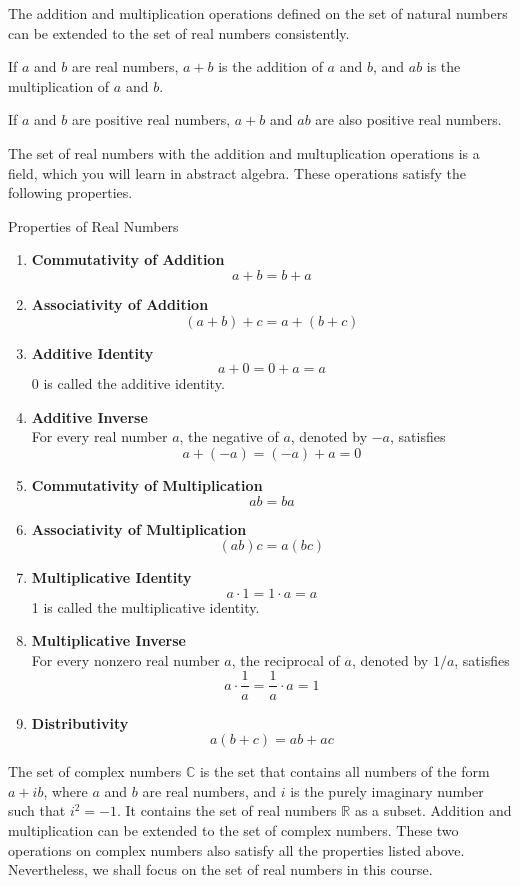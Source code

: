 The   addition and multiplication operations defined on the set of natural numbers can be extended to the set of real numbers consistently. 

If $a$ and $b$ are  real numbers, $a+b$ is the addition of  $a$ and $b$, and $ab$ is the multiplication of $a$ and $b$.

If $a$ and $b$ are positive real numbers, $a+b$ and $ab$ are also positive real numbers.



The set of real numbers with the addition and multuplication operations is a field, which you will learn in abstract algebra. These operations satisfy the following properties.


 
 \begin{highlight}{Properties of Real Numbers}

 
         \begin{enumerate} [1.]
\item
\textbf{Commutativity of Addition}
\[a+b=b+a\]
\item \textbf{Associativity of Addition}
\[(a+b)+c=a+(b+c)\]
\item\textbf{Additive Identity }
\[a+0=0+a=a\]
0 is called the additive identity.
\item\textbf{Additive Inverse}
\\For every real number $a$, the negative of $a$, denoted by $-a$, satisfies
\[a+(-a)=(-a)+a=0\]

\item
\textbf{Commutativity of Multiplication}
\[ab=ba\]
\item \textbf{Associativity of Multiplication}
\[(ab)c=a(bc)\]

\item\textbf{Multiplicative Identity }
\[a\cdot 1=1\cdot a=a\]
1 is called the multiplicative identity.
\item\textbf{Multiplicative Inverse}
\\For every nonzero real number $a$, the reciprocal of $a$, denoted by $1/a$, satisfies
\[a\cdot \frac{1}{a}=\frac{1}{a}\cdot a=1\]
\item \textbf{Distributivity}
\[a(b+c)=ab+ac\]
\end{enumerate}
 \end{highlight}



\vfill\pagebreak
 
The set of complex numbers $\mathbb{C}$ is the set that contains all numbers of the form $a+ib$, where $a$ and $b$ are real numbers, and $i$ is the purely imaginary number such that $i^2=-1$. It contains the set of real numbers $\mathbb{R}$ as a subset. Addition and multiplication can be extended to the set of complex numbers. These two operations on complex numbers also satisfy all the properties listed above. Nevertheless, we shall focus on the set of real numbers in this course.


